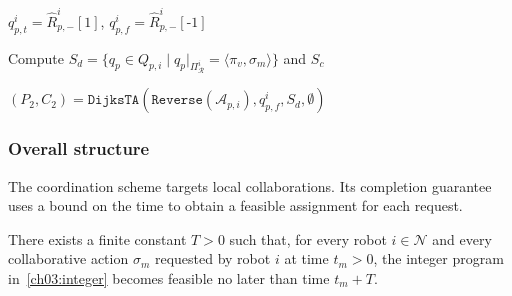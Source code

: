 \begin{algorithm}[t!]
\caption{Delay collaboration, \texttt{DelayCol}()}
\label{ch03:alg:delay}
\DontPrintSemicolon


$q_{p,t}^i=\widehat{R}_{p,-}^i[1]$,
$q_{p,f}^i=\widehat{R}_{p,-}^i[\text{-1}]$\;

Compute
$S_d=
\{q_p \in Q_{p,i} \mid
  q_p|_{\Pi_{\mathcal{R}}^i}
  = \langle \pi_v,\sigma_m \rangle\}$ and $S_c$\;

\;
\;

$(P_2,C_2)=\texttt{DijksTA}
(\texttt{Reverse}(\mathcal{A}_{p,i}),q_{p,f}^i,S_d,\emptyset)$\;

\;
\end{algorithm}


\subsubsection{Overall structure}
\label{ch03:structure}

\begin{revision}
The coordination scheme targets local collaborations. Its completion guarantee
uses a bound on the time to obtain a feasible assignment for each request.
\end{revision}

\begin{assumption}
\label{ch03:assump:loose}
There exists a finite constant ${T}>0$ such that, for every robot
$i \in \mathcal{N}$ and every collaborative action $\sigma_m$ requested by
robot $i$ at time $t_m>0$, the integer program in~\eqref{ch03:integer}
becomes feasible no
later than time $t_m+{T}$.
\end{assumption}

